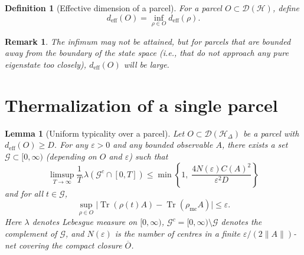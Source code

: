 \documentclass[11pt, onecolumn]{article}
\newtheorem{lemma}{Lemma}
\newtheorem{definition}{Definition}
\newtheorem{remark}{Remark}
\begin{document}
\begin{definition}[Effective dimension of a parcel]
For a parcel \(O\subset\mathcal{D}(\mathcal{H})\), define
\[
d_{\mathrm{eff}}(O) = \inf_{\rho\in O} d_{\mathrm{eff}}(\rho).
\]
\end{definition}

\begin{remark}
The infimum may not be attained, but for parcels that are bounded away from the boundary of the state space (i.e., that do not approach any pure eigenstate too closely), \(d_{\mathrm{eff}}(O)\) will be large.
\end{remark}

\section{Thermalization of a single parcel}

\begin{lemma}[Uniform typicality over a parcel]
\label{lem:uniform}
Let \(O \subset \mathcal D(\mathcal H_\Delta)\) be a parcel with \(d_{\mathrm{eff}}(O)\ge D\). For any \(\varepsilon>0\) and any bounded observable \(A\), there exists a set \(\mathcal{G}\subset[0,\infty)\) (depending on \(O\) and \(\varepsilon\)) such that
\[
\limsup_{T\to\infty}\frac{1}{T}\,\lambda(\mathcal{G}^c\cap[0,T]) \le \min\left\{1,\; \frac{4N(\varepsilon) C(A)^2}{\varepsilon^2 D}\right\}
\]
and for all \(t\in\mathcal{G}\),
\[
\sup_{\rho\in O} \bigl|\operatorname{Tr}(\rho(t)A)-\operatorname{Tr}(\rho_{\mathrm{mc}}A)\bigr| \le \varepsilon.
\]
Here \(\lambda\) denotes Lebesgue measure on \([0,\infty)\),
\(\mathcal G^c=[0,\infty)\setminus\mathcal G\) denotes the complement
of \(\mathcal G\), and \(N(\varepsilon)\) is the number of centres in a
finite \(\varepsilon/(2\|A\|)\)-net covering the compact closure
\(\overline O\).
\end{lemma}
\end{document}
